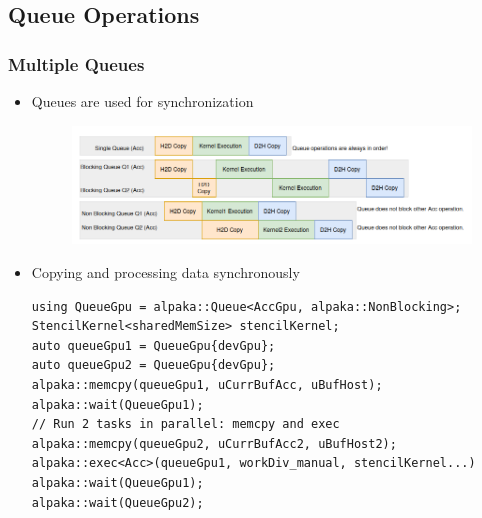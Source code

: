 \documentclass[9pt]{beamer}
\begin{document}
\subsection{Queue Operations}
\begin{frame}[fragile]
\frametitle{Multiple Queues}
\begin{itemize}
\item Queues are used for synchronization

\begin{figure}
    \centering
    \includegraphics[width=0.8\linewidth]{Screenshot from 2024-10-16 14-52-12.png}
    \label{fig:enter-label}
\end{figure}

\item Copying and processing data synchronously
\begin{lstlisting}
using QueueGpu = alpaka::Queue<AccGpu, alpaka::NonBlocking>;
StencilKernel<sharedMemSize> stencilKernel;
auto queueGpu1 = QueueGpu{devGpu};
auto queueGpu2 = QueueGpu{devGpu};
alpaka::memcpy(queueGpu1, uCurrBufAcc, uBufHost);
alpaka::wait(QueueGpu1);
// Run 2 tasks in parallel: memcpy and exec
alpaka::memcpy(queueGpu2, uCurrBufAcc2, uBufHost2);
alpaka::exec<Acc>(queueGpu1, workDiv_manual, stencilKernel...)
alpaka::wait(QueueGpu1);
alpaka::wait(QueueGpu2);
\end{lstlisting}
\end{itemize}
\end{frame}
\end{document}
